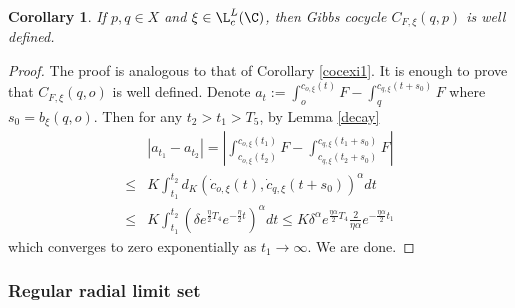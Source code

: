\documentclass[11pt]{amsart}
\newtheorem{corollary}[theorem]{Corollary}
\theoremstyle{definition}
\def\a{\alpha}
\def\d{\delta}   %
\begin{document}
\begin{corollary}\label{cocexi2}
If $p, q\in X$ and $\xi\in \L_c^L(\C)$, then Gibbs cocycle $C_{F,\xi}(q,p)$ is well defined.    
\end{corollary}

\begin{proof}
The proof is analogous to that of Corollary \ref{cocexi1}. It is enough to prove that $C_{F,\xi}(q,o)$ is well defined. Denote $a_t:=\int_{o}^{c_{o,\xi}(t)}F-\int_{q}^{c_{q,\xi}(t+s_0)}F$ where $s_0=b_\xi(q,o)$. Then for any $t_2>t_1>T_5$, by Lemma \ref{decay}
\begin{equation*}
\begin{aligned}
&|a_{t_1}-a_{t_2}|=\left|\int_{c_{o,\xi}(t_2)}^{c_{o,\xi}(t_1)}F-\int_{c_{q,\xi}(t_2+s_0)}^{c_{q,\xi}(t_1+s_0)}F\right|\\
\le &K\int_{t_1}^{t_2}d_K(\dot c_{o,\xi}(t), \dot c_{q,\xi}(t+s_0))^\a dt\\
\le &K\int_{t_1}^{t_2}(\d e^{\frac{\eta}{2}T_4}e^{-\frac{\eta}{2}t})^\a dt\le K \d^\a e^{\frac{\eta\a}{2}T_4}\frac{2}{\eta\a}e^{-\frac{\eta\a}{2}t_1}
\end{aligned}
\end{equation*}
which converges to zero exponentially as $t_1\to \infty$. We are done.
\end{proof}

\subsubsection{Regular radial limit set}
\end{document}
